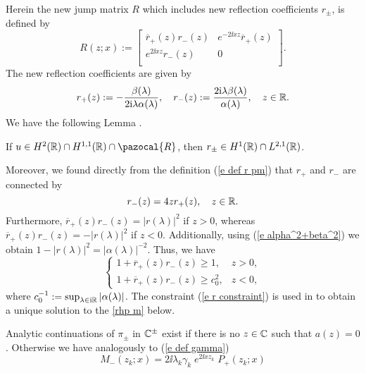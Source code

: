Herein the new jump matrix $R$ which includes new reflection coefficients $r_{\pm}$, is defined by
\begin{equation*}
    R(z;x):=
        \left[
          \begin{array}{cc}
            \overline{r}_+(z)r_-(z) & e^{-2\ii xz}\overline{r}_+(z) \\
            e^{2\ii xz}r_-(z) & 0 \\
          \end{array}
        \right].
\end{equation*}
The new reflection coefficients are given by
\begin{equation}\label{e def r pm}
    r_{+}(z):=-\frac{\beta(\lambda)} {2\mathrm{i}\lambda\alpha(\lambda)},\quad
    r_{-}(z):=\frac{2\mathrm{i}\lambda\beta(\lambda)} {\alpha(\lambda)},\quad z\in\mathbb R.
\end{equation}
We have the following Lemma \cite{Pelinovsky2016}.
\begin{lem}\label{l r pm in H1 and L^21}
    If $u\in H^2(\Real)\cap H^{1,1}(\Real)\cap\pazocal{R}$, then $r_{\pm}\in H^1(\mathbb R) \cap L^{2,1}(\mathbb R)$.
\end{lem}
Moreover, we found directly from the definition (\ref{e def r pm}) that $r_+$ and $r_-$ are connected by
\begin{equation}\label{e relation r+ r-}
    r_-(z)=4zr_+(z),\quad z\in\mathbb R.
\end{equation}
Furthermore, $\overline{r}_+(z)r_-(z)=|r(\lambda)|^2$ if $z>0$, whereas $\overline{r}_+(z)r_-(z)=-|r(\lambda)|^2$ if $z<0$. Additionally, using (\ref{e alpha^2+beta^2}) we obtain $1-|r(\lambda)|^2=|\alpha(\lambda)|^{-2}$. Thus, we have
\begin{equation}\label{e r constraint}
   \left\{
     \begin{array}{ll}
       1+\overline{r}_+(z)r_-(z)\geq1, & z>0, \\
       1+\overline{r}_+(z)r_-(z)\geq c_0^2, & z<0,
     \end{array}
   \right.
\end{equation}
where $c_0^{-1}:=\sup_{\lambda\in\mathrm{i}\mathbb R}|\alpha(\lambda)|$. The constraint (\ref{e r constraint}) is used in \cite{Pelinovsky2016} to obtain a unique solution to the \rh \ref{rhp m} below.\par
Analytic continuations of $\pi_{\pm}$ in $\mathbb C^{\pm}$ exist if there is no $z\in\mathbb C$ such that $a(z)=0$. Otherwise we have analogously to (\ref{e def gamma})
\begin{equation*}
    M_{-}(z_k;x)=2\ii\lambda_k\gamma_k\; e^{2\ii x z_k}\; P_{+}(z_k;x)
\end{equation*}
